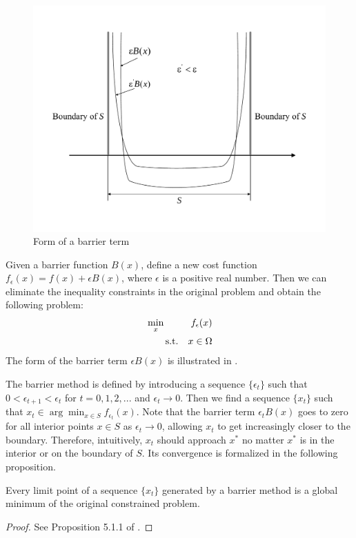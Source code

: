 \begin{figure}[ht]
\centering
\includegraphics[scale=0.4]{figures/lecture25-barrier_function}
\caption{Form of a barrier term}
\label{fig:barrier}
\end{figure}

Given a barrier function $B(x)$, define a new cost function
$f_\epsilon(x)=f(x)+\epsilon{B(x)}$, where $\epsilon$ is a positive real number.
Then we can eliminate the inequality constraints in the original problem and
obtain the following problem: 
%
\begin{equation}
\begin{aligned}
&\min_x & {f_\epsilon(x)}\\
&\qquad\text{s.t.} & x\in{\Omega}
\end{aligned}
\end{equation}
The form of the barrier term $\epsilon{B(x)}$ is illustrated in .

The barrier method is defined by introducing a sequence $\{\epsilon_t\}$ such
that $0<\epsilon_{t+1}<\epsilon_t$ for $t=0,1,2,...$ and
$\epsilon_t\rightarrow{0}$. Then we find a sequence $\{x_t\}$ such that
$x_t\in{\arg \min_{x\in{S}}}f_{\epsilon_t}(x)$. Note that the barrier term
$\epsilon_t{B(x)}$ goes to zero for all interior points $x\in{S}$ as
$\epsilon_t\rightarrow{0}$, allowing $x_t$ to get increasingly closer to the
boundary. Therefore, intuitively, $x_t$ should approach $x^*$ no matter $x^*$ is
in the interior or on the boundary of $S$. Its convergence is formalized in the
following proposition. 

\begin{proposition}
Every limit point of a sequence $\{x_t\}$ generated by a barrier method is a global minimum of the original constrained problem. 
\end{proposition}
\begin{proof}
See Proposition 5.1.1 of \cite{bertsekas2016nonlinear}.
\end{proof}

